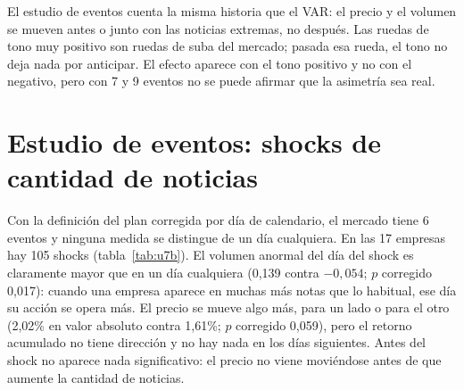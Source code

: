 El estudio de eventos cuenta la misma historia que el VAR: el precio y el volumen se mueven
antes o junto con las noticias extremas, no después. Las ruedas de tono muy positivo son ruedas
de suba del mercado; pasada esa rueda, el tono no deja nada por anticipar. El efecto aparece
con el tono positivo y no con el negativo, pero con 7 y 9 eventos no se puede afirmar que la
asimetría sea real.

\section{Estudio de eventos: shocks de cantidad de noticias}
\label{sec:res-u7b}

Con la definición del plan corregida por día de calendario, el mercado tiene 6 eventos y
ninguna medida se distingue de un día cualquiera. En las 17 empresas hay 105 shocks
(tabla~\ref{tab:u7b}). El volumen anormal del día del shock es claramente mayor que en un día
cualquiera (0,139 contra $-0{,}054$; $p$ corregido 0,017): cuando una empresa aparece en muchas
más notas que lo habitual, ese día su acción se opera más. El precio se mueve algo más, para un
lado o para el otro (2,02\% en valor absoluto contra 1,61\%; $p$ corregido 0,059), pero el
retorno acumulado no tiene dirección y no hay nada en los días siguientes. Antes del shock no
aparece nada significativo: el precio no viene moviéndose antes de que aumente la cantidad de
noticias.

